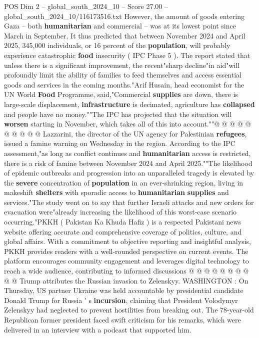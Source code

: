 \begin{textsample}{POS Dim 2 – global\_south\_2024\_10 – Score 27.00 – global\_south\_2024\_10/116173516.txt}
However, the amount of goods entering Gaza -- both \textbf{humanitarian} and commercial -- was at its lowest point since March in September.
It thus predicted that between November 2024 and April 2025, 345,000 individuals, or 16 percent of the \textbf{population}, will probably experience catastrophic \textbf{food} insecurity ( IPC Phase 5 ).
The report stated that unless there is a significant improvement, the recent"sharp decline"in aid"will profoundly limit the ability of families to feed themselves and access essential goods and services in the coming months."Arif Husain, head economist for the UN World \textbf{Food} Programme, said,"Commercial \textbf{supplies} are down, there is large-scale displacement, \textbf{infrastructure} is decimated, agriculture has \textbf{collapsed} and people have no money.""The IPC has projected that the situation will \textbf{worsen} starting in November, which takes all of this into account.""@ @ @ @ @ @ @ @ @ @ Lazzarini, the director of the UN agency for Palestinian \textbf{refugees}, issued a famine warning on Wednesday in the region.
According to the IPC assessment,"as long as conflict continues and \textbf{humanitarian} access is restricted, there is a risk of famine between November 2024 and April 2025.""The likelihood of epidemic outbreaks and progression into an unparalleled tragedy is elevated by the \textbf{severe} concentration of \textbf{population} in an ever-shrinking region, living in makeshift \textbf{shelters} with sporadic access to \textbf{humanitarian} \textbf{supplies} and services."The study went on to say that further Israeli attacks and new orders for evacuation were"already increasing the likelihood of this worst-case scenario occurring."PKKH ( Pakistan Ka Khuda Hafiz ) is a respected Pakistani news website offering accurate and comprehensive coverage of politics, culture, and global affairs.
With a commitment to objective reporting and insightful analysis, PKKH provides readers with a well-rounded perspective on current events.
The platform encourages community engagement and leverages digital technology to reach a wide audience, contributing to informed discussions @ @ @ @ @ @ @ @ @ @ Trump attributes the Russian invasion to Zelenskyy.
WASHINGTON : On Thursday, US partner Ukraine was held accountable by presidential candidate Donald Trump for Russia ' s \textbf{incursion}, claiming that President Volodymyr Zelenskyy had neglected to prevent hostilities from breaking out.
The 78-year-old Republican former president faced swift criticism for his remarks, which were delivered in an interview with a podcast that supported him.

\end{textsample}
